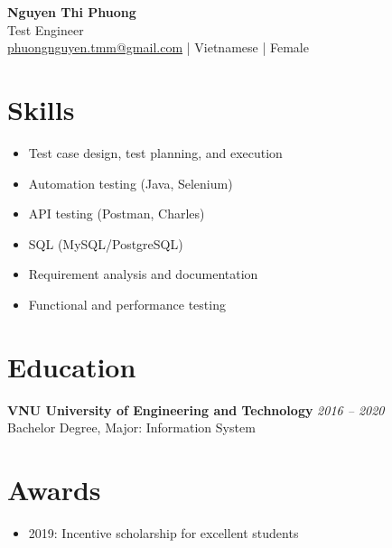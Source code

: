 \documentclass[11pt,a4paper]{article}
\begin{document}
    \begin{center}
    {\LARGE \textbf{Nguyen Thi Phuong}}\\
    \vspace{2mm}
    Test Engineer \\
    \vspace{1mm}
    \href{mailto:phuongnguyen.tmm@gmail.com}{phuongnguyen.tmm@gmail.com} \quad | Vietnamese \quad | \quad Female \quad
    \end{center}

    \vspace{2mm}

    \section*{Skills}
    \begin{itemize}[leftmargin=1.5em]
        \item Test case design, test planning, and execution
        \item Automation testing (Java, Selenium)
        \item API testing (Postman, Charles)
        \item SQL (MySQL/PostgreSQL)
        \item Requirement analysis and documentation
        \item Functional and performance testing
    \end{itemize}

    \section*{Education}
    \textbf{VNU University of Engineering and Technology} \hfill \textit{2016 -- 2020} \\
    Bachelor Degree, Major: Information System

    \section*{Awards}
    \begin{itemize}[leftmargin=1.5em]
        \item 2019: Incentive scholarship for excellent students
    \end{itemize}

\end{document}
